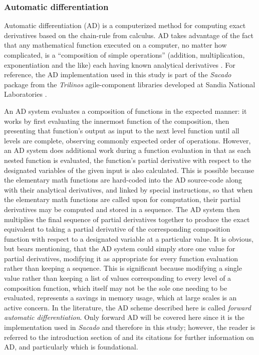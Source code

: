 \documentclass[preprint,12pt]{elsarticle}
\begin{document}
\subsubsection{Automatic differentiation} 
\label{ADsubsection}

Automatic differentiation (AD) is a computerized method for computing exact derivatives based on the chain-rule from calculus. AD takes advantage of the fact that any mathematical function executed on a computer, no matter how complicated, is a ``composition of simple operations'' (addition, multiplication, exponentiation and the like) each having known analytical derivatives \cite{ref-sacado-presentation}. For reference, the AD implementation used in this study is part of the \emph{Sacado} package from the \emph{Trilinos} agile-component libraries developed at Sandia National Laboratories \cite{ref-Sacado}.

An AD system evaluates a composition of functions in the expected manner: it works by first evaluating the innermost function of the composition, then presenting that function's output as input to the next level function until all levels are complete, observing commonly expected order of operations. However, an AD system does additional work during a function evaluation in that as each nested function is evaluated, the function's partial derivative with respect to the designated variables of the given input is also calculated.  This is possible because the elementary math functions are hard-coded into the AD source-code along with their analytical derivatives, and linked by special instructions, so that when the elementary math functions are called upon for computation, their partial derivatives may be computed and stored in a sequence. The AD system then multiplies the final sequence of partial derivatives together to produce the exact equivalent to taking a partial derivative of the corresponding composition function with respect to a designated variable at a particular value. 
%
It is obvious, but bears mentioning, that the AD system could simply store one value for partial derivatives, modifying it as appropriate for every function evaluation rather than keeping a sequence. This is significant because modifying a single value rather than keeping a list of values corresponding to every level of a composition function, which itself may not be the sole one needing to be evaluated, represents a savings in memory usage, which at large scales is an active concern. In the literature, the AD scheme described here is called \emph{forward automatic differentiation}. Only forward AD will be covered here since it is the implementation used in \emph{Sacado} and therefore in this study; however, the reader is referred to the introduction section of \cite{ref-AD-methods} and its citations for further information on AD, and
particularly \cite{ref-on-AD} which is foundational.
\end{document}
